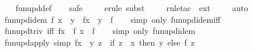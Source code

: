 \begin{isabellebody}
%
\isadelimproof
\ \ %
\endisadelimproof
%
\isatagproof
{}\isamarkupfalse%
\ fun{\isacharunderscore}{\kern0pt}upd{\isacharunderscore}{\kern0pt}def\isanewline
\ \ \isamarkupfalse%
\ safe\isanewline
\ \ \ \isamarkupfalse%
\ {\isacharparenleft}{\kern0pt}erule\ subst{\isacharparenright}{\kern0pt}\isanewline
\ \ \ \isamarkupfalse%
\ {\isacharparenleft}{\kern0pt}rule{\isacharunderscore}{\kern0pt}tac\ {\isacharbrackleft}{\kern0pt}{}{\isacharbrackright}{\kern0pt}\ ext{\isacharparenright}{\kern0pt}\isanewline
\ \ \ \isamarkupfalse%
\ auto\isanewline
\ \ \isamarkupfalse%
%
\endisatagproof
{\isafoldproof}%
%
\isadelimproof
\isanewline
%
\endisadelimproof
\isanewline
{}\isamarkupfalse%
\ fun{\isacharunderscore}{\kern0pt}upd{\isacharunderscore}{\kern0pt}idem{\isacharcolon}{\kern0pt}\ {\isachardoublequoteopen}f\ x\ {\isacharequal}{\kern0pt}\ y\ {\isasymLongrightarrow}\ f{\isacharparenleft}{\kern0pt}x\ {\isacharcolon}{\kern0pt}{\isacharequal}{\kern0pt}\ y{\isacharparenright}{\kern0pt}\ {\isacharequal}{\kern0pt}\ f{\isachardoublequoteclose}\isanewline
%
\isadelimproof
\ \ %
\endisadelimproof
%
\isatagproof
{}\isamarkupfalse%
\ {\isacharparenleft}{\kern0pt}simp\ only{\isacharcolon}{\kern0pt}\ fun{\isacharunderscore}{\kern0pt}upd{\isacharunderscore}{\kern0pt}idem{\isacharunderscore}{\kern0pt}iff{\isacharparenright}{\kern0pt}%
\endisatagproof
{\isafoldproof}%
%
\isadelimproof
\isanewline
%
\endisadelimproof
\isanewline
{}\isamarkupfalse%
\ fun{\isacharunderscore}{\kern0pt}upd{\isacharunderscore}{\kern0pt}triv\ {\isacharbrackleft}{\kern0pt}iff{\isacharbrackright}{\kern0pt}{\isacharcolon}{\kern0pt}\ {\isachardoublequoteopen}f{\isacharparenleft}{\kern0pt}x\ {\isacharcolon}{\kern0pt}{\isacharequal}{\kern0pt}\ f\ x{\isacharparenright}{\kern0pt}\ {\isacharequal}{\kern0pt}\ f{\isachardoublequoteclose}\isanewline
%
\isadelimproof
\ \ %
\endisadelimproof
%
\isatagproof
{}\isamarkupfalse%
\ {\isacharparenleft}{\kern0pt}simp\ only{\isacharcolon}{\kern0pt}\ fun{\isacharunderscore}{\kern0pt}upd{\isacharunderscore}{\kern0pt}idem{\isacharparenright}{\kern0pt}%
\endisatagproof
{\isafoldproof}%
%
\isadelimproof
\isanewline
%
\endisadelimproof
\isanewline
{}\isamarkupfalse%
\ fun{\isacharunderscore}{\kern0pt}upd{\isacharunderscore}{\kern0pt}apply\ {\isacharbrackleft}{\kern0pt}simp{\isacharbrackright}{\kern0pt}{\isacharcolon}{\kern0pt}\ {\isachardoublequoteopen}{\isacharparenleft}{\kern0pt}f{\isacharparenleft}{\kern0pt}x\ {\isacharcolon}{\kern0pt}{\isacharequal}{\kern0pt}\ y{\isacharparenright}{\kern0pt}{\isacharparenright}{\kern0pt}\ z\ {\isacharequal}{\kern0pt}\ {\isacharparenleft}{\kern0pt}if\ z\ {\isacharequal}{\kern0pt}\ x\ then\ y\ else\ f\ z{\isacharparenright}{\kern0pt}{\isachardoublequoteclose}\isanewline

\end{isabellebody}
